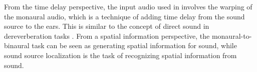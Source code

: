 From the time delay perspective, the input audio used in \cite{richard2021neural, leng2022binauralgrad} involves the warping of the monaural audio, which is a technique of adding time delay from the sound source to the ears. This is similar to the concept of direct sound in dereverberation tasks \cite{zhao2024multi, guo2024graph}. From a spatial information perspective, the monaural-to-binaural task can be seen as generating spatial information for sound, while sound source localization \cite{feng2023soft,feng2024learning,feng2025eliminating} is the task of recognizing spatial information from sound.
